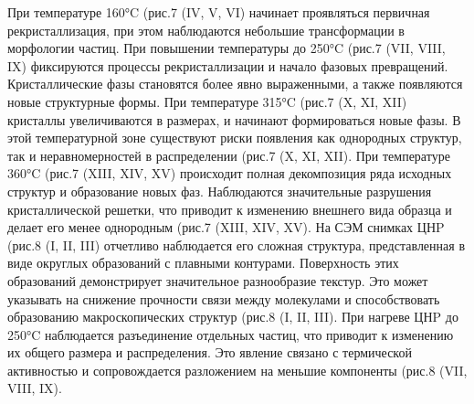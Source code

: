 \hfill
{}
\figend

\hfill
{}
\figend

\begin{multicols}{2}
При температуре 160°C (рис.7 (IV, V, VI) начинает проявляться первичная
рекристаллизация, при этом наблюдаются небольшие трансформации в
морфологии частиц. При повышении температуры до 250°C (рис.7 (VII, VIII,
IX) фиксируются процессы рекристаллизации и начало фазовых превращений.
Кристаллические фазы становятся более явно выраженными, а также
появляются новые структурные формы. При температуре 315°C (рис.7 (X, XI,
XII) кристаллы увеличиваются в размерах, и начинают формироваться новые
фазы. В этой температурной зоне существуют риски появления как
однородных структур, так и неравномерностей в распределении (рис.7 (X,
XI, XII). При температуре 360°C (рис.7 (XIII, XIV, XV) происходит полная
декомпозиция ряда исходных структур и образование новых фаз. Наблюдаются
значительные разрушения кристаллической решетки, что приводит к
изменению внешнего вида образца и делает его менее однородным (рис.7
(XIII, XIV, XV). На СЭМ снимках ЦНP (рис.8 (I, II, III) отчетливо
наблюдается его сложная структура, представленная в виде округлых
образований с плавными контурами. Поверхность этих образований
демонстрирует значительное разнообразие текстур. Это может указывать на
снижение прочности связи между молекулами и способствовать образованию
макроскопических структур (рис.8 (I, II, III). При нагреве ЦНP до 250°C
наблюдается разъединение отдельных частиц, что приводит к изменению их
общего размера и распределения. Это явление связано с термической
активностью и сопровождается разложением на меньшие компоненты (рис.8
(VII, VIII, IX).
\end{multicols}

\hfill
{}
\figend

